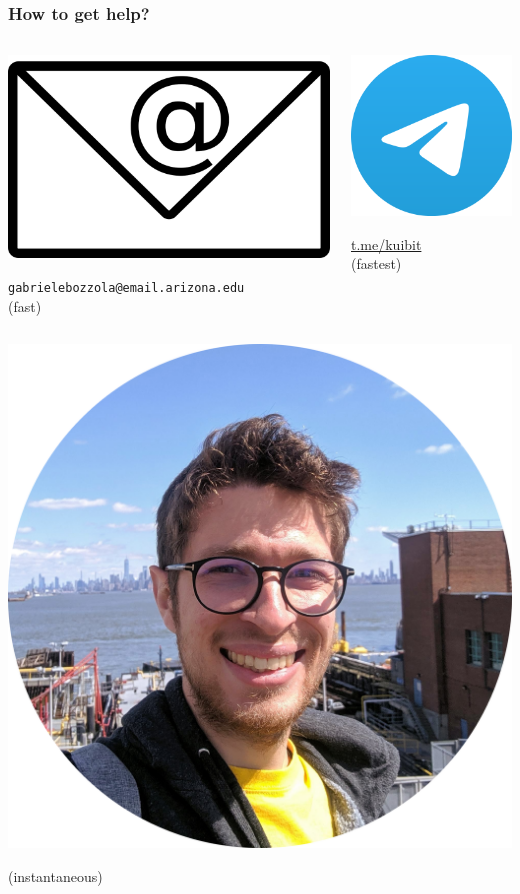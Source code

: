 \documentclass[compress, aspectratio=169]{beamer}
\begin{document}
\begin{frame}
  \frametitle{How to get help?}
  \begin{columns}
    \begin{column}{0.5\linewidth}
      \centering
      \includegraphics[width=0.4\columnwidth]{email}

      \texttt{gabrielebozzola@email.arizona.edu} \\
      (fast)
    \end{column}
    \begin{column}{0.5\linewidth}
      \centering
      \includegraphics[width=0.3\columnwidth]{telegram}

      \url{t.me/kuibit} \\
      (fastest) \\[1cm]
    \end{column}
  \end{columns}
      \centering
      \includegraphics[width=0.2\columnwidth]{profil-circ}

      (instantaneous)
\end{frame}
\end{document}
